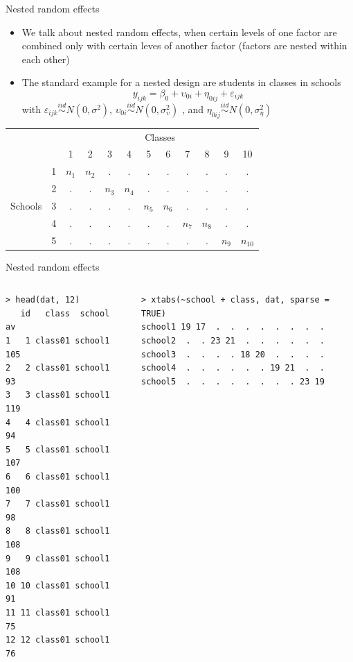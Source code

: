 \documentclass[aspectratio=169]{beamer}
\begin{document}
\begin{frame}{Nested random effects}
  \begin{itemize}
    \item We talk about nested random effects, when certain levels of one factor
      are combined only with certain leves of another factor (factors are nested
      within each other)
    \item The standard example for a nested design are students in classes in
      schools
  \[
    y_{ijk} = \beta_0 + \upsilon_{0i} + \eta_{0ij} + \varepsilon_{ijk}
    \]
  with $\varepsilon_{ijk} \overset{iid}{\sim} N(0,\sigma^2)$, $\upsilon_{0i} \overset{iid}{\sim}
  N(0,\sigma^2_{\upsilon})$ , and $\eta_{0ij} \overset{iid}{\sim} N(0,\sigma^2_{\eta})$
      \end{itemize}
 \begin{center}
  \begin{tabular}{lccccccccccc}
    & & \multicolumn{10}{c}{Classes}\\
    \cline{3-12}
     & & 1 & 2 & 3 & 4 & 5 & 6 & 7 & 8 & 9 & 10\\
    \hline
         & 1 & $n_1$ & $n_2$ & . & . & . & . & . & . & . & . \\
         & 2 & . & . & $n_3$ & $n_4$ & . & . & . & . & . & . \\
Schools  & 3 & . & . & . & . & $n_5$ & $n_6$ & . & . & . & . \\
         & 4 & . & . & . & . & . & . & $n_7$ & $n_8$ & . & . \\
         & 5 & . & . & . & . & . & . & . & . & $n_9$ & $n_{10}$\\
      \hline
  \end{tabular}
  \end{center}
\end{frame}
\begin{frame}[fragile]{Nested random effects}
  \vspace{-.6cm}
  \begin{columns}
    \begin{column}[t]{.38\textwidth}
  \begin{lstlisting}
> head(dat, 12)
   id   class  school  av
1   1 class01 school1 105
2   2 class01 school1  93
3   3 class01 school1 119
4   4 class01 school1  94
5   5 class01 school1 107
6   6 class01 school1 100
7   7 class01 school1  98
8   8 class01 school1 108
9   9 class01 school1 108
10 10 class01 school1  91
11 11 class01 school1  75
12 12 class01 school1  76
  \end{lstlisting}
    \end{column}

    \begin{column}[t]{.63\textwidth}
  \begin{lstlisting}
> xtabs(~school + class, dat, sparse = TRUE)
school1 19 17  .  .  .  .  .  .  .  .
school2  .  . 23 21  .  .  .  .  .  .
school3  .  .  .  . 18 20  .  .  .  .
school4  .  .  .  .  .  . 19 21  .  .
school5  .  .  .  .  .  .  .  . 23 19
  \end{lstlisting}
    \end{column}
  \end{columns}
\end{frame}
\end{document}
